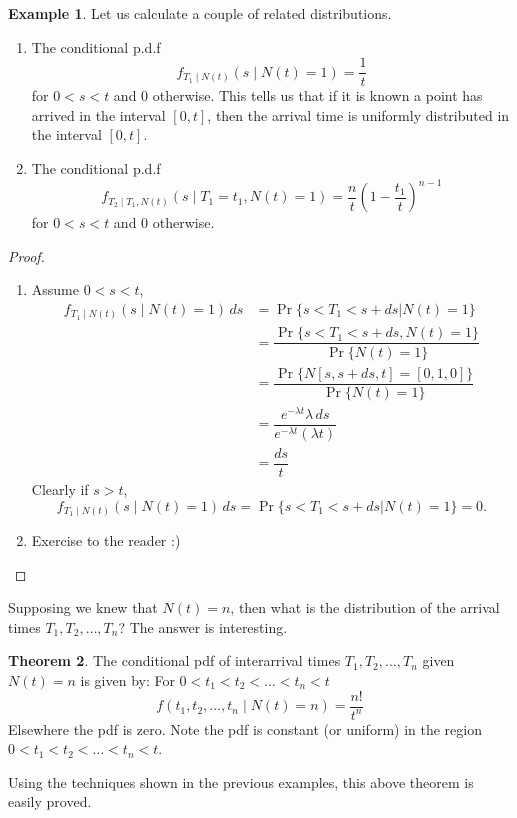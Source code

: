 \documentclass[letterpaper, 12pt]{article}
\newcommand{\1}{\mathds{1}} %
\theoremstyle{definition}
\newtheorem{theorem}{Theorem}[section]
\newtheorem{example}[theorem]{Example}
\begin{document}
\begin{example}
\label{example:Nuniform}
Let us calculate a couple of related distributions.
\begin{enumerate}
\item The conditional p.d.f \[f_{T_1 \mid N(t)}(s \mid N(t)=1)=\dfrac1{t}\] for $0<s<t$ and $0$ otherwise. This tells us that if it is known a point has arrived in the interval $[0,t]$, then the arrival time is uniformly distributed in the interval $[0,t]$.
\item The conditional p.d.f \[f_{T_2 \mid T_1, N(t)}(s \mid T_1=t_1, N(t)=1)=\dfrac{n}{t}\left(1- \dfrac{t_1}{t}\right)^{n-1}\] for $0<s<t$ and $0$ otherwise.
\end{enumerate}
\begin{proof}
\begin{enumerate}
\item Assume $0 < s< t$, 
\begin{align*}
f_{T_1 \mid N(t)}(s \mid N(t)=1)\, ds &= \Pr\{s < T_1 < s+ds | N(t)=1\}\\
                                      &= \dfrac{\Pr\{s < T_1 < s+ds , N(t)=1\}}{\Pr\{N(t)=1\}}\\
                                      &= \dfrac{\Pr\{N[s,s+ds,t]=[0,1,0]\}}{\Pr\{N(t)=1\}}\\
                                      &= \dfrac{e^{-\lambda t}\lambda \, ds}{e^{-\lambda t}(\lambda t)}\\
                                      &= \dfrac{ds}{t}
\end{align*}
Clearly if $s > t$, \[f_{T_1 \mid N(t)}(s \mid N(t)=1) \, ds = \Pr\{s < T_1 < s+ds | N(t)=1\} = 0.\]
\item Exercise to the reader :)
\end{enumerate}
\end{proof} 
\end{example}

Supposing we knew that $N(t)=n$, then what is the distribution of the arrival times $T_1,T_2,\ldots,T_n$? The answer is interesting. 
\begin{theorem}
The conditional pdf of interarrival times $T_1,T_2,\ldots,T_n$ given $N(t)=n$ is given by: For $0<t_1<t_2<\ldots< t_n < t$
\[f(t_1,t_2,\ldots,t_n\mid N(t)=n) = \dfrac{n!}{t^n}\]
Elsewhere the pdf is zero. Note the pdf is constant (or uniform) in the region $0<t_1<t_2<\ldots< t_n < t$.
\end{theorem}
Using the techniques shown in the previous examples, this above theorem is easily proved.
\end{document}
